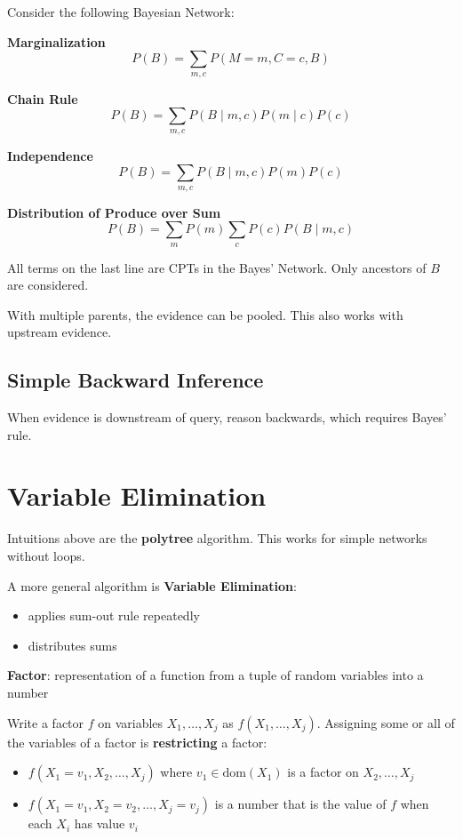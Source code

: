 \documentclass[11pt]{article}
\begin{document}
Consider the following Bayesian Network:

\textbf{Marginalization}
$$ P(B) = \sum_{m, c} P(M = m, C = c, B) $$

\textbf{Chain Rule}
$$ P(B) = \sum_{m, c} P(B \mid m, c) P(m \mid c) P(c) $$

\textbf{Independence}
$$ P(B) = \sum_{m, c} P(B \mid m, c) P(m) P(c) $$

\textbf{Distribution of Produce over Sum}
$$ P(B) = \sum_{m} P(m) \sum_{c} P(c) P(B \mid m, c) $$

All terms on the last line are CPTs in the Bayes' Network.
Only ancestors of \(B\) are considered.

With multiple parents, the evidence can be pooled.
This also works with upstream evidence.
\subsection{Simple Backward Inference}
\label{sec:orgb5e6e90}
When evidence is downstream of query, reason backwards, which requires Bayes' rule.
\section{Variable Elimination}
\label{sec:org95178fb}
Intuitions above are the \textbf{polytree} algorithm.
This works for simple networks without loops.

A more general algorithm is \textbf{Variable Elimination}:
\begin{itemize}
\item applies sum-out rule repeatedly
\item distributes sums
\end{itemize}

\textbf{Factor}: representation of a function from a tuple of random variables into a number

Write a factor \(f\) on variables \(X_{1}, \dots, X_{j}\) as \(f(X_{1}, \dots, X_{j})\).
Assigning some or all of the variables of a factor is \textbf{restricting} a factor:
\begin{itemize}
\item \(f(X_{1} = v_{1}, X_{2}, \dots, X_{j})\) where \(v_{1} \in \text{dom}(X_{1})\) is a factor on
\(X_{2}, \dots, X_{j}\)
\item \(f(X_{1} = v_{1}, X_{2} = v_{2}, \dots, X_{j} = v_{j})\) is a number that is the value of \(f\)
when each \(X_{i}\) has value \(v_{i}\)
\end{itemize}
\end{document}

